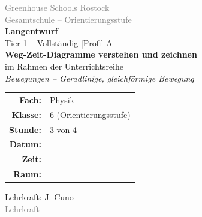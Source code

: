 \documentclass[11pt,a4paper]{article}
\newcommand{\fach}{Physik}
\newcommand{\jahrgangsstufe}{6}
\newcommand{\schulart}{Gesamtschule}
\newcommand{\kursart}{Orientierungsstufe}
\newcommand{\stundenthema}{Weg-Zeit-Diagramme verstehen und zeichnen}
\newcommand{\reihenthema}{Bewegungen -- Geradlinige, gleichförmige Bewegung}
\newcommand{\stundennummer}{3}
\newcommand{\reihenstunden}{4}
\newcommand{\lehrkraft}{J. Cuno}
\newcommand{\ausbildungsstand}{Lehrkraft}
\begin{document}
\begin{titlepage}
    \centering
    \vspace*{2cm}

    {\Large\textcolor{gray}{Greenhouse Schools Rostock}}\\[0.5cm]
    {\large\textcolor{gray}{\schulart{} -- Orientierungsstufe}}\\[2cm]

    {\Huge\textcolor{fach}{\textbf{Langentwurf}}}\\[0.5cm]
    {\large Tier 1 -- Vollständig \quad|\quad Profil A}\\[2cm]

    {\LARGE\textbf{\stundenthema}}\\[0.5cm]
    {\large im Rahmen der Unterrichtsreihe}\\[0.3cm]
    {\Large\textit{\reihenthema}}\\[2cm]

    \begin{tabular}{rl}
        \textbf{Fach:} & \fach \\[0.3cm]
        \textbf{Klasse:} & \jahrgangsstufe{} (\kursart) \\[0.3cm]
        \textbf{Stunde:} & \stundennummer{} von \reihenstunden \\[0.3cm]
        \textbf{Datum:} & \underline{\hspace{3cm}} \\[0.3cm]
        \textbf{Zeit:} & \underline{\hspace{3cm}} \\[0.3cm]
        \textbf{Raum:} & \underline{\hspace{3cm}} \\[0.3cm]
    \end{tabular}

    \vfill

    {\large Lehrkraft: \lehrkraft}\\[0.3cm]
    {\normalsize\textcolor{gray}{\ausbildungsstand}}\\[1cm]

\end{titlepage}

\tableofcontents
\newpage
\end{document}
